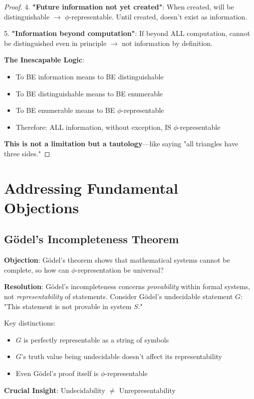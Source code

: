 \documentclass[12pt,letterpaper]{article}
\begin{document}
\begin{proof}
4. \textbf{"Future information not yet created"}: When created, will be distinguishable $\to$ $\phi$-representable. Until created, doesn't exist as information.

5. \textbf{"Information beyond computation"}: If beyond ALL computation, cannot be distinguished even in principle $\to$ not information by definition.

\textbf{The Inescapable Logic}:
\begin{itemize}
\item To BE information means to BE distinguishable
\item To BE distinguishable means to BE enumerable  
\item To BE enumerable means to BE $\phi$-representable
\item Therefore: ALL information, without exception, IS $\phi$-representable
\end{itemize}

\textbf{This is not a limitation but a tautology}—like saying "all triangles have three sides."
\end{proof}

\section{Addressing Fundamental Objections}

\subsection{Gödel's Incompleteness Theorem}

\textbf{Objection}: Gödel's theorem shows that mathematical systems cannot be complete, so how can $\phi$-representation be universal?

\textbf{Resolution}: Gödel's incompleteness concerns \textit{provability} within formal systems, not \textit{representability} of statements. Consider Gödel's undecidable statement $G$: "This statement is not provable in system $S$."

Key distinctions:
\begin{itemize}
\item $G$ is perfectly representable as a string of symbols
\item $G$'s truth value being undecidable doesn't affect its representability  
\item Even Gödel's proof itself is $\phi$-representable
\end{itemize}

\textbf{Crucial Insight}: Undecidability $\neq$ Unrepresentability
\end{document}
